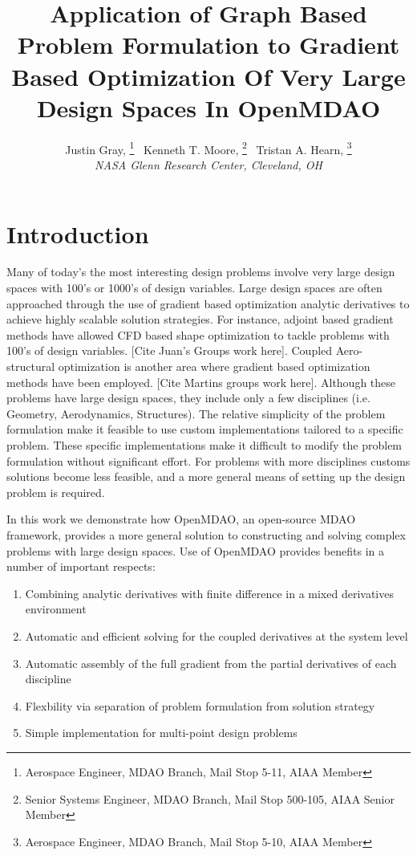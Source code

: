 \documentclass[]{aiaa-tc} %
\title{Application of Graph Based Problem Formulation to Gradient Based Optimization Of Very Large Design Spaces In OpenMDAO}
\author{
  Justin Gray,%
     \thanks{Aerospace Engineer, MDAO Branch, Mail Stop 5-11, AIAA Member}
  \ Kenneth T. Moore,%
     \thanks{Senior Systems Engineer, MDAO Branch, Mail Stop 500-105, AIAA Senior Member}  
   \ Tristan A. Hearn,%
     \thanks{Aerospace Engineer, MDAO Branch, Mail Stop 5-10, AIAA Member}\\
  {\normalsize\itshape
  NASA Glenn Research Center, Cleveland, OH}  \\
 }
\begin{document}
  \maketitle
   
  \begin{abstract}

  \end{abstract}

  \section{Introduction}

    Many of today's the most interesting design problems involve very large design spaces with 100's or 1000's of 
    design variables. Large design spaces are often approached through the use of gradient based optimization 
    analytic derivatives to achieve highly scalable solution strategies. For instance, adjoint based gradient 
    methods have allowed CFD based shape optimization to tackle problems with 100's of design variables. [Cite Juan's Groups
    work here]. Coupled Aero-structural optimization is another area where gradient based optimization methods have 
    been employed. [Cite Martins groups work here]. Although these problems have large design spaces, 
    they include only a few disciplines (i.e. Geometry, Aerodynamics, Structures). The relative simplicity of 
    the problem formulation make it feasible to use custom implementations tailored to a specific problem. These specific 
    implementations make it difficult to modify the problem formulation without significant effort. For problems 
    with more disciplines customs solutions become less feasible, and a more general means of setting up 
    the design problem is required. 

    In this work we demonstrate how OpenMDAO, an open-source MDAO framework, provides a more general 
    solution to constructing and solving complex problems with large design spaces. Use of OpenMDAO 
    provides benefits in a number of important respects: 

    \begin{enumerate}
      \item Combining analytic derivatives with finite difference in a mixed derivatives environment
      \item Automatic and efficient solving for the coupled derivatives at the system level 
      \item Automatic assembly of the full gradient from the partial derivatives of each discipline
      \item Flexbility via separation of problem formulation from solution strategy 
      \item Simple implementation for multi-point design problems
    \end{enumerate}
\end{document}
